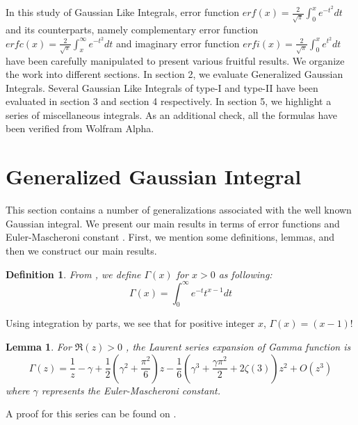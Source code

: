 \documentclass[a4paper,twoside,10pt]{article}
\newtheorem{lemma}{Lemma}[theorem]
\newtheorem{definition}{Definition}
\begin{document}
 In this study of Gaussian Like Integrals, error function   $erf(x)= \frac{2}{\sqrt{\pi}}\int_0^x e^{-t^2} dt   $ and its counterparts, namely complementary error function   $erfc(x)=\frac{2}{\sqrt{\pi}} \int_x^{\infty} e^{-t^2} dt  $ and imaginary error function   $erfi(x)=\frac{2}{\sqrt{\pi}} \int_0^x e^{t^2} dt  $ have been carefully manipulated to present various fruitful results. 
 We organize the work into different sections. In section 2, we evaluate Generalized Gaussian Integrals. Several Gaussian Like Integrals of type-I and type-II have been evaluated in section 3 and section 4 respectively. In section 5, we highlight a series of miscellaneous integrals. As an additional check, all the formulas have been verified from Wolfram Alpha.

 \section{Generalized Gaussian Integral}
This section contains a number of generalizations associated with the well known Gaussian integral. We present our main results in terms of error functions \cite{AS1972} and Euler-Mascheroni constant \cite{Wei2002}. First, we mention some definitions, lemmas, and then we construct our main results. 


\begin{definition}
From \cite{SG2002}, we define   $\Gamma(x)  $ for   $x>0  $ as following:
\begin{equation}\label{Gamma}
 \Gamma(x) = \int_0^{\infty} e^{-t} t^{x-1} dt 
\end{equation}
\end{definition}
Using integration by parts, we see that for positive integer $x$,   $\Gamma(x)=(x-1)!  $


\begin{lemma}
    For   $\Re(z)>0  $ , the Laurent series expansion of Gamma function is 
\begin{equation}\label{gammaseries}
     \Gamma(z)=\frac{1}{z}-\gamma +\frac{1}{2}(\gamma^2+\frac{\pi^2}{6})z-\frac{1}{6}(\gamma^3+\frac{\gamma \pi^2}{2}+2\zeta(3) )z^2+O(z^3)  
\end{equation}
where   $\gamma  $ represents the Euler-Mascheroni constant.
\end{lemma}
A proof for this series can be found on \cite{M2016}.
\end{document}

